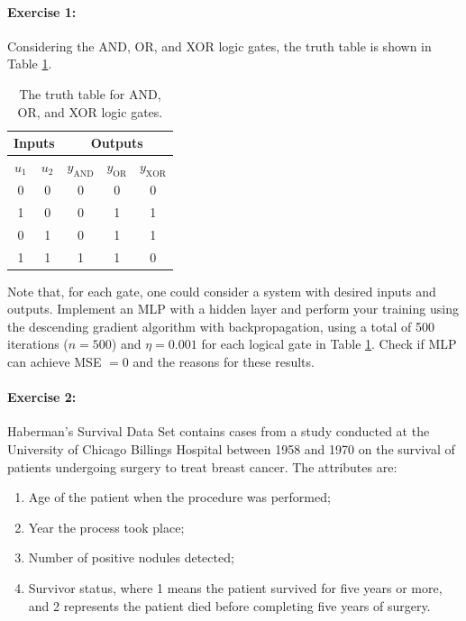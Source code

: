 \paragraph{\textbf{Exercise 1:}} Considering the AND, OR, and XOR logic gates, the truth table is shown in Table \ref{tab:verdade}.

\begin{table}[h!]
\caption{The truth table for AND, OR, and XOR logic gates.}
\label{tab:verdade}
\begin{center}
\begin{tabular}{cc|ccc}
\hline
\multicolumn{2}{c|}{Inputs} & \multicolumn{3}{c}{Outputs}                                  \\ \hline
$u_1$         & $u_2$        & $y_{\textrm{AND}}$ & $y_{\textrm{OR}}$ & $y_{\textrm{XOR}}$ \\ \hline
0             & 0            & 0                  & 0                 & 0                  \\
1             & 0            & 0                  & 1                 & 1                  \\
0             & 1            & 0                  & 1                 & 1                  \\
1             & 1            & 1                  & 1                 & 0                 \\ \hline
\end{tabular}
\end{center}
\end{table}

Note that, for each gate, one could consider a system with desired inputs and outputs. Implement an MLP with a hidden layer and perform your training using the descending gradient algorithm with backpropagation, using a total of 500 iterations ($n = 500$) and $\eta = 0.001$ for each logical gate in Table \ref{tab:verdade}. Check if MLP can achieve MSE $ = 0$ and the reasons for these results.

\paragraph{\textbf{Exercise 2:}} Haberman's Survival Data Set contains cases from a study conducted at the University of Chicago Billings Hospital between 1958 and 1970 on the survival of patients undergoing surgery to treat breast cancer. The attributes are:
\begin{enumerate}
    \item Age of the patient when the procedure was performed;
	\item Year the process took place;
	\item Number of positive nodules detected;
	\item Survivor status, where 1 means the patient survived for five years or more, and 2 represents the patient died before completing five years of surgery.
\end{enumerate}


